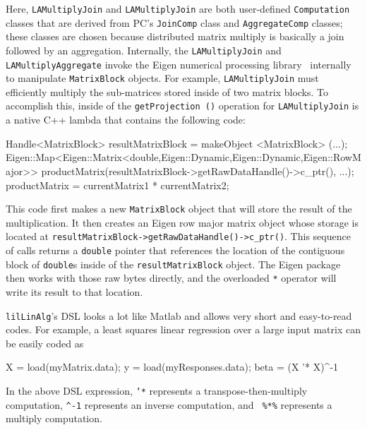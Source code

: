 \noindent Here, \texttt{LAMultiplyJoin} and \texttt{LAMultiplyJoin} are 
both user-defined \texttt{Computation} classes that are
derived from PC's \texttt{JoinComp} class and \texttt{AggregateComp} classes; these classes are chosen 
because distributed matrix multiply
is basically a join followed by an aggregation.
Internally, the \texttt{LAMultiplyJoin}
and \texttt{LAMultiplyAggregate} invoke the Eigen numerical processing
library~\cite{eigen} internally to manipulate \texttt{MatrixBlock} objects.
For example, \texttt{LAMultiplyJoin} must efficiently multiply the sub-matrices stored inside of two matrix blocks.
To accomplish this, inside of the \texttt{getProjection ()} operation for
\texttt{LAMultiplyJoin} is a native C++ lambda that contains the following code:

\begin{code}
Handle<MatrixBlock> resultMatrixBlock = makeObject <MatrixBlock> (...);
Eigen::Map<Eigen::Matrix<double,Eigen::Dynamic,Eigen::Dynamic,Eigen::RowMajor>> 
   productMatrix(resultMatrixBlock->getRawDataHandle()->c_ptr(), ...);
productMatrix = currentMatrix1 * currentMatrix2;
\end{code}

\noindent This code first makes a new \texttt{MatrixBlock} object that will store the result of the multiplication.
 It then creates an 
Eigen row major matrix object whose storage is located at 
\texttt{resultMatrixBlock->}\-\texttt{getRaw}\-\texttt{DataHandle()->}\-\texttt{c\_ptr()}.  This
sequence of calls
returns a \texttt{double} pointer that references the location of the contiguous block of \texttt{double}s inside of
the \texttt{resultMatrixBlock} object.
The Eigen package then works with those raw bytes directly,
and the overloaded \texttt{*} operator will write its result to that location.

\noindent
\texttt{lilLinAlg}'s DSL looks a lot like Matlab and allows very short and easy-to-read codes.
For example, 
a least squares linear regression over a large input matrix can be easily coded as

\begin{code}
X = load(myMatrix.data); 
y = load(myResponses.data); 
beta = (X '* X)^-1 %
\end{code}

\noindent In the above DSL expression, \texttt{'*} represents a transpose-then-multiply computation,
\texttt{\^{}-1} represents an inverse computation, and \texttt{ \%*\%}
represents a multiply computation. 

